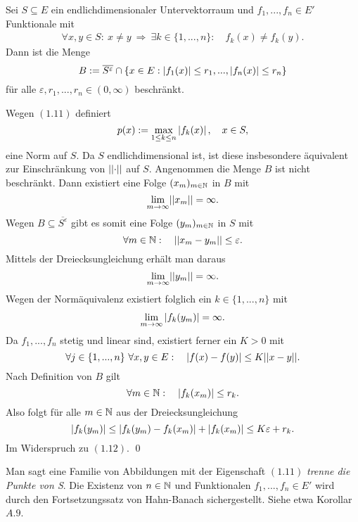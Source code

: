 \begin{lemma}
    Sei $S \subseteq E$ ein endlichdimensionaler Untervektorraum und $f_1,...,f_n \in E'$ Funktionale mit 
    \begin{align}
        \forall x,y \in S: \ x \neq y \ \Rightarrow \ \exists k \in \{1,...,n\}: \quad f_k(x) \neq f_k(y).
    \end{align}
    Dann ist die Menge 
    $$
        B := \overline{S^{\varepsilon}} \cap \{x \in E: \left| f_1(x) \right| \leq r_1,...,\left| f_n(x) \right|\leq r_n\}
    $$
    für alle $\varepsilon, r_1,...,r_n \in (0, \infty)$ beschränkt. 
\end{lemma}

\begin{proof*}
    Wegen $(1.11)$ definiert 
    $$
        p(x) := \max_{1\leq k \leq n} \left| f_k(x) \right|, \quad x \in S,
    $$
    eine Norm auf $S$. Da $S$ endlichdimensional ist, ist diese insbesondere äquivalent zur Einschränkung von $\lvert\lvert \cdot \rvert\rvert$ auf $S$. 
    Angenommen die Menge $B$ ist nicht beschränkt. Dann existiert eine Folge $(x_m)_{m \in \mathbb{N}}$ in $B$ mit 
    $$
        \lim_{m \to \infty} \lvert\lvert x_m \rvert\rvert = \infty. 
    $$
    Wegen $B \subseteq \overline{S^{\varepsilon}}$ gibt es somit eine Folge $(y_m)_{m \in \mathbb{N}}$ in $S$ mit 
    $$
        \forall m \in \mathbb{N}: \quad \lvert\lvert x_m - y_m \rvert\rvert \leq \varepsilon. 
    $$
    Mittels der Dreiecksungleichung erhält man daraus
    $$
        \lim_{m \to \infty}\lvert\lvert y_m \rvert\rvert = \infty. 
    $$
    Wegen der Normäquivalenz existiert folglich ein $k \in \{1,...,n\}$ mit 
    \begin{align}
        \lim_{m \to \infty}\left| f_k(y_m) \right| = \infty. 
    \end{align}
    Da $f_1,...,f_n$ stetig und linear sind, existiert ferner ein $K > 0$ mit 
    $$
        \forall j \in \{1,...,n\} \ \forall x,y \in E: \quad \left| f(x)-f(y) \right| \leq K \lvert\lvert x-y \rvert\rvert. 
    $$
    Nach Definition von $B$ gilt 
    $$
        \forall m \in \mathbb{N}: \quad \left| f_k(x_m) \right| \leq r_k.
    $$
    Also folgt für alle $m \in \mathbb{N}$ aus der Dreiecksungleichung
    $$
        \left| f_k(y_m) \right| \leq \left| f_k(y_m) - f_k(x_m) \right| + \left| f_k(x_m) \right| \leq K \varepsilon + r_k. 
    $$
    Im Widerspruch zu $(1.12)$. \qed
\end{proof*}

\begin{remark}%
    Man sagt eine Familie von Abbildungen mit der Eigenschaft $(1.11)$ \textit{trenne die Punkte von S}.
    Die Existenz von $n \in \mathbb{N}$ und Funktionalen $f_1,...,f_n \in E'$ wird durch den Fortsetzungssatz von Hahn-Banach sichergestellt. Siehe etwa Korollar $A.9$. 
\end{remark}

